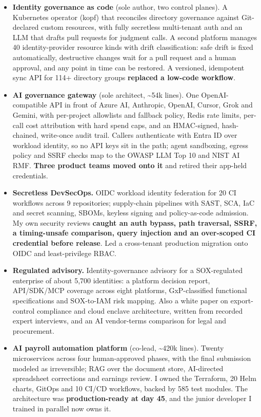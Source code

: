 \documentclass[10pt,letterpaper]{article}
\begin{document}
\begin{itemize}
\item \textbf{Identity governance as code} {\color{muted}(sole author, two control planes)}. A Kubernetes operator (kopf) that reconciles directory governance against Git-declared custom resources, with fully secretless multi-tenant auth and an LLM that drafts pull requests for judgment calls. A second platform manages 40 identity-provider resource kinds with drift classification: safe drift is fixed automatically, destructive changes wait for a pull request and a human approval, and any point in time can be restored. A versioned, idempotent sync API for 114+ directory groups \textbf{replaced a low-code workflow}.
\item \textbf{AI governance gateway} {\color{muted}(sole architect, \textasciitilde{}54k lines)}. One OpenAI-compatible API in front of Azure AI, Anthropic, OpenAI, Cursor, Grok and Gemini, with per-project allowlists and fallback policy, Redis rate limits, per-call cost attribution with hard spend caps, and an HMAC-signed, hash-chained, write-once audit trail. Callers authenticate with Entra ID over workload identity, so no API keys sit in the path; agent sandboxing, egress policy and SSRF checks map to the OWASP LLM Top 10 and NIST AI RMF. \textbf{Three product teams moved onto it} and retired their app-held credentials.
\item \textbf{Secretless DevSecOps.} OIDC workload identity federation for 20 CI workflows across 9 repositories; supply-chain pipelines with SAST, SCA, IaC and secret scanning, SBOMs, keyless signing and policy-as-code admission. My own security reviews \textbf{caught an auth bypass, path traversal, SSRF, a timing-unsafe comparison, query injection and an over-scoped CI credential before release}. Led a cross-tenant production migration onto OIDC and least-privilege RBAC.
\item \textbf{Regulated advisory.} Identity-governance advisory for a SOX-regulated enterprise of about 5,700 identities: a platform decision report, API/SDK/MCP coverage across eight platforms, GxP-classified functional specifications and SOX-to-IAM risk mapping. Also a white paper on export-control compliance and cloud enclave architecture, written from recorded expert interviews, and an AI vendor-terms comparison for legal and procurement.
\item \textbf{AI payroll automation platform} {\color{muted}(co-lead, \textasciitilde{}420k lines)}. Twenty microservices across four human-approved phases, with the final submission modeled as irreversible; RAG over the document store, AI-directed spreadsheet corrections and earnings review. I owned the Terraform, 20 Helm charts, GitOps and 10 CI/CD workflows, backed by 585 test modules. The architecture was \textbf{production-ready at day 45}, and the junior developer I trained in parallel now owns it.

\end{itemize}
\end{document}

